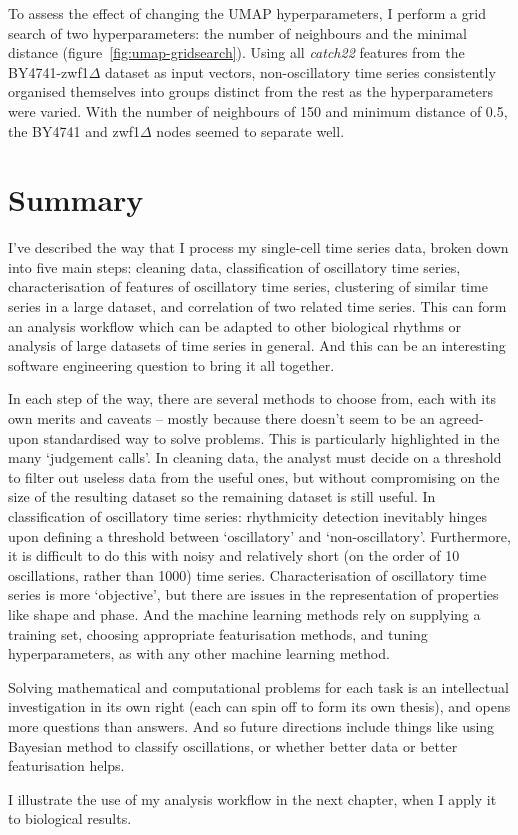 To assess the effect of changing the UMAP hyperparameters, I perform a grid search of two hyperparameters: the number of neighbours and the minimal distance (figure~\ref{fig:umap-gridsearch}).
Using all \textit{catch22} features from the BY4741-zwf1$\Delta$ dataset as input vectors, non-oscillatory time series consistently organised themselves into groups distinct from the rest as the hyperparameters were varied.
With the number of neighbours of 150 and minimum distance of 0.5, the BY4741 and zwf1$\Delta$ nodes seemed to separate well.

\section{Summary}
\label{sec:analysis-summary}

I've described the way that I process my single-cell time series data, broken down into five main steps: cleaning data, classification of oscillatory time series, characterisation of features of oscillatory time series, clustering of similar time series in a large dataset, and correlation of two related time series.
This can form an analysis workflow which can be adapted to other biological rhythms or analysis of large datasets of time series in general.
And this can be an interesting software engineering question to bring it all together.

In each step of the way, there are several methods to choose from, each with its own merits and caveats -- mostly because there doesn't seem to be an agreed-upon standardised way to solve problems.
This is particularly highlighted in the many `judgement calls'.
In cleaning data, the analyst must decide on a threshold to filter out useless data from the useful ones, but without compromising on the size of the resulting dataset so the remaining dataset is still useful.
In classification of oscillatory time series: rhythmicity detection inevitably hinges upon defining a threshold between `oscillatory' and `non-oscillatory'.
Furthermore, it is difficult to do this with noisy and relatively short (on the order of 10 oscillations, rather than 1000) time series.
Characterisation of oscillatory time series is more `objective', but there are issues in the representation of properties like shape and phase.
And the machine learning methods rely on supplying a training set, choosing appropriate featurisation methods, and tuning hyperparameters, as with any other machine learning method.

Solving mathematical and computational problems for each task is an intellectual investigation in its own right (each can spin off to form its own thesis), and opens more questions than answers.
And so future directions include things like using Bayesian method to classify oscillations, or whether better data or better featurisation helps.

I illustrate the use of my analysis workflow in the next chapter, when I apply it to biological results.
